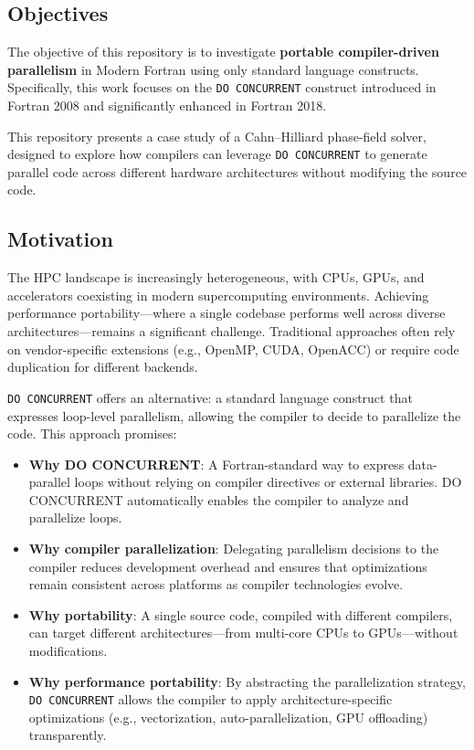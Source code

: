 \documentclass[11pt,a4paper]{article}
\begin{document}
	\subsection{Objectives}
	
	The objective of this repository is to investigate \textbf{portable compiler-driven parallelism} in Modern Fortran using only standard language constructs. Specifically, this work focuses on the \texttt{DO CONCURRENT} construct introduced in Fortran 2008 and significantly enhanced in Fortran 2018.
	
	This repository presents a case study of a Cahn–Hilliard phase-field solver, designed to explore how compilers can leverage \texttt{DO CONCURRENT} to generate parallel code across different hardware architectures without modifying the source code.
	
	\subsection{Motivation}
	
	The HPC landscape is increasingly heterogeneous, with CPUs, GPUs, and accelerators coexisting in modern supercomputing environments. Achieving performance portability—where a single codebase performs well across diverse architectures—remains a significant challenge. Traditional approaches often rely on vendor-specific extensions (e.g., OpenMP, CUDA, OpenACC) or require code duplication for different backends.
	
	\texttt{DO CONCURRENT} offers an alternative: a standard language construct that expresses loop-level parallelism, allowing the compiler to decide to parallelize the code. This approach promises:
	
	\begin{itemize}
		\item \textbf{Why DO CONCURRENT}: A Fortran-standard way to express data-parallel loops without relying on compiler directives or external libraries. DO CONCURRENT automatically enables the compiler to analyze and parallelize loops.
		
		\item \textbf{Why compiler parallelization}: Delegating parallelism decisions to the compiler reduces development overhead and ensures that optimizations remain consistent across platforms as compiler technologies evolve.
		
		\item \textbf{Why portability}: A single source code, compiled with different compilers, can target different architectures—from multi-core CPUs to GPUs—without modifications.
		
		\item \textbf{Why performance portability}: By abstracting the parallelization strategy, \texttt{DO CONCURRENT} allows the compiler to apply architecture-specific optimizations (e.g., vectorization, auto-parallelization, GPU offloading) transparently.
	\end{itemize}
	
\end{document}
